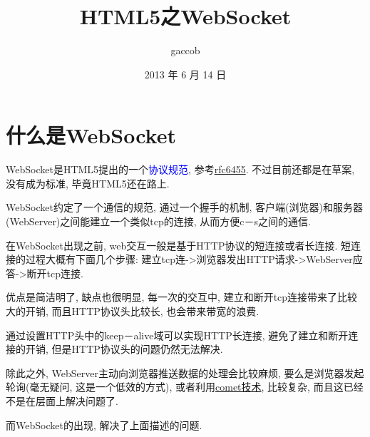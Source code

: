 

\title {\ZHH \huge HTML5之WebSocket}
\author {\small gaccob}
\date {\small 2013 年 6 月 14 日}
\maketitle

\section {\ZHH 什么是WebSocket} {
    {WebSocket是HTML5提出的一个\textcolor{blue}{协议规范}, 参考\href{http://tools.ietf.org//rfc6455}{rfc6455}. 不过目前还都是在草案, 没有成为标准, 毕竟HTML5还在路上.} \par

    {WebSocket约定了一个通信的规范, 通过一个握手的机制, 客户端(浏览器)和服务器(WebServer)之间能建立一个类似tcp的连接, 从而方便c－s之间的通信.}\par
    {在WebSocket出现之前, web交互一般是基于HTTP协议的短连接或者长连接. 短连接的过程大概有下面几个步骤: 建立tcp连->浏览器发出HTTP请求->WebServer应答->断开tcp连接.}\par

    {优点是简洁明了, 缺点也很明显, 每一次的交互中, 建立和断开tcp连接带来了比较大的开销, 而且HTTP协议头比较长, 也会带来带宽的浪费.}\par

    {通过设置HTTP头中的keep－alive域可以实现HTTP长连接, 避免了建立和断开连接的开销, 但是HTTP协议头的问题仍然无法解决.}\par

    {除此之外, WebServer主动向浏览器推送数据的处理会比较麻烦, 要么是浏览器发起轮询(毫无疑问, 这是一个低效的方式), 或者利用\href{http://zh.wikipedia.org/wiki/Comet\_(web\%E6\%8A\%80\%E6\%9C\%AF)}{comet技术}, 比较复杂, 而且这已经不是在层面上解决问题了.}\par

    {而WebSocket的出现, 解决了上面描述的问题.}\par
}


